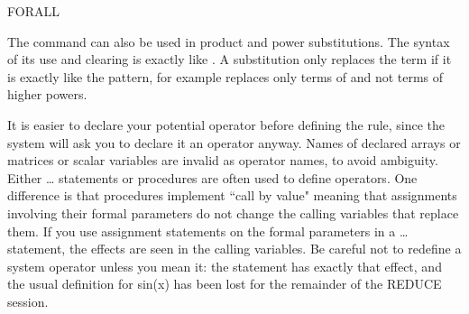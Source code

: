 \begin{Command}{FORALL}
\begin{Comments}
The  command can also be used in product and power substitutions.
The syntax of its use and clearing is exactly like .  A 
substitution only replaces the term if it is exactly like the pattern, for
example  replaces only terms of  and not
terms of higher powers.

It is easier to declare your potential operator before defining the 
 rule, since the system will ask you to declare it an
operator anyway.  Names of declared arrays or matrices or scalar
variables are invalid as operator names, to avoid ambiguity.  Either
\ldots{} statements or procedures are often used to define
operators.  One difference is that procedures implement ``call by value"
meaning that assignments involving their formal parameters do not change
the calling variables that replace them.  If you use assignment statements
on the formal parameters in a \ldots{} statement, the
effects are seen in the calling variables.  Be careful not to redefine a
system operator unless you mean it: the statement  has exactly that effect, and the usual definition for sin(x) has
been lost for the remainder of the REDUCE session. \end{Comments}
\end{Command}

